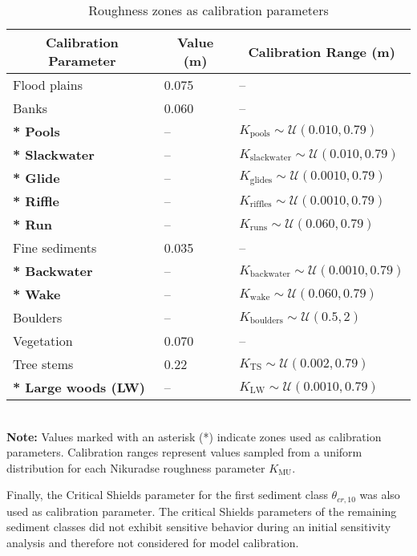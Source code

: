 \documentclass[draft,linenumbers,onecolumn]{agujournal2019} %
\begin{document}
\begin{table}[H]
	\centering
	\caption{Roughness zones as calibration parameters}
	\begin{tabular}{p{5.5cm} p{3cm} p{5.5cm}}
		\hline
		\multicolumn{1}{c}{\textbf{Calibration Parameter}} & 
		\multicolumn{1}{c}{\textbf{Value (m)}} & 
		\multicolumn{1}{c}{\textbf{Calibration Range (m)}} \\ \hline
		Flood plains              & 0.075   & -- \\
		Banks                     & 0.060   & -- \\
		\textbf{* Pools}           & --   & $K_{\text{pools}} \sim \mathcal{U}(0.010, 0.79)$ \\
		\textbf{* Slackwater}      & --   & $K_{\text{slackwater}} \sim \mathcal{U}(0.010, 0.79)$ \\
		\textbf{* Glide}          & --   & $K_{\text{glides}} \sim \mathcal{U}(0.0010, 0.79)$ \\
		\textbf{* Riffle}          & --   & $K_{\text{riffles}} \sim \mathcal{U}(0.0010, 0.79)$ \\
		\textbf{* Run}             & --   & $K_{\text{runs}} \sim \mathcal{U}(0.060, 0.79)$ \\
		Fine sediments            & 0.035   & -- \\
		\textbf{* Backwater}       & --   & $K_{\text{backwater}} \sim \mathcal{U}(0.0010, 0.79)$ \\
		\textbf{* Wake}            & --   & $K_{\text{wake}} \sim \mathcal{U}(0.060, 0.79)$ \\
		{Boulders}        & --   & $K_{\text{boulders}} \sim \mathcal{U}(0.5, 2)$ \\
		Vegetation                & 0.070   & -- \\
		Tree stems                & {0.22}   & $K_{\text{TS}} \sim \mathcal{U}(0.002,0.79)$ \\
		\textbf{* Large woods (LW)}  & -- & $K_{\text{LW}} \sim \mathcal{U}(0.0010, 0.79)$ \\ \hline
	\end{tabular}
	\label{tab:roughness_zones}
	\\
	\textbf{Note:} Values marked with an asterisk (*) indicate zones used as calibration parameters. Calibration ranges represent values sampled from a uniform distribution for each Nikuradse roughness parameter $K_{\text{MU}}$.
\end{table}

Finally, the Critical Shields parameter for the first sediment class $\theta_{cr,10}$ was also used as calibration parameter.  The critical Shields parameters of the remaining sediment classes did not exhibit sensitive behavior during an initial sensitivity analysis and therefore not considered for model calibration. 
\end{document}

